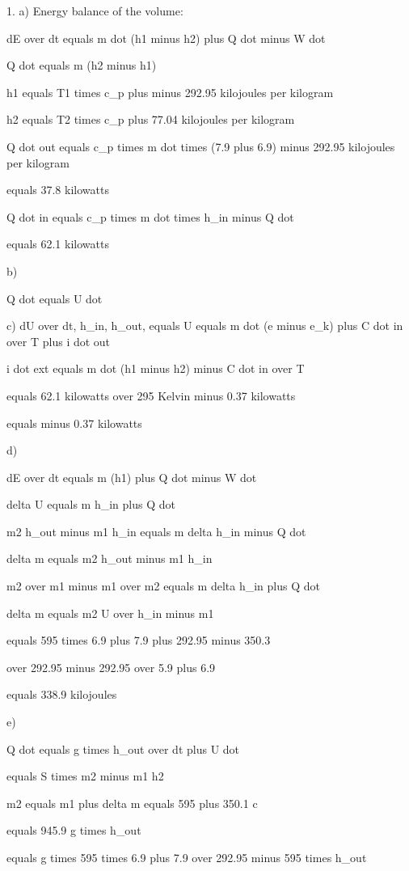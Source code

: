 1. a) Energy balance of the volume:

dE over dt equals m dot (h1 minus h2) plus Q dot minus W dot

Q dot equals m (h2 minus h1)

h1 equals T1 times c_p plus minus 292.95 kilojoules per kilogram

h2 equals T2 times c_p plus 77.04 kilojoules per kilogram

Q dot out equals c_p times m dot times (7.9 plus 6.9) minus 292.95 kilojoules per kilogram

equals 37.8 kilowatts

Q dot in equals c_p times m dot times h_in minus Q dot

equals 62.1 kilowatts

b) 

Q dot equals U dot

c) dU over dt, h_in, h_out, equals U equals m dot (e minus e_k) plus C dot in over T plus i dot out

i dot ext equals m dot (h1 minus h2) minus C dot in over T

equals 62.1 kilowatts over 295 Kelvin minus 0.37 kilowatts

equals minus 0.37 kilowatts

d) 

dE over dt equals m (h1) plus Q dot minus W dot

delta U equals m h_in plus Q dot

m2 h_out minus m1 h_in equals m delta h_in minus Q dot

delta m equals m2 h_out minus m1 h_in

m2 over m1 minus m1 over m2 equals m delta h_in plus Q dot

delta m equals m2 U over h_in minus m1

equals 595 times 6.9 plus 7.9 plus 292.95 minus 350.3

over 292.95 minus 292.95 over 5.9 plus 6.9

equals 338.9 kilojoules

e) 

Q dot equals g times h_out over dt plus U dot

equals S times m2 minus m1 h2

m2 equals m1 plus delta m equals 595 plus 350.1 c

equals 945.9 g times h_out

equals g times 595 times 6.9 plus 7.9 over 292.95 minus 595 times h_out

